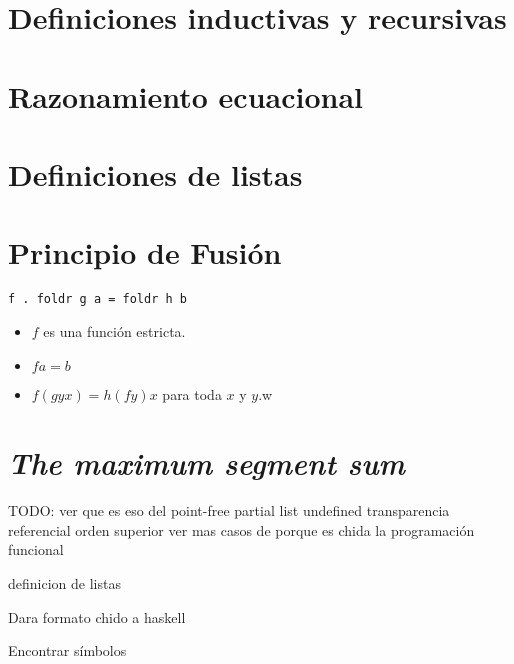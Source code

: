\section{Definiciones inductivas y recursivas}

\section{Razonamiento ecuacional}


\section{Definiciones de listas}

\section{Principio de Fusión}
\begin{verbatim}
f . foldr g a = foldr h b
\end{verbatim}

\begin{itemize}
    \item $f$ es una función estricta.
    \item $f a = b$
    \item $f(g y x) = h (f y) x$ para toda $x$ y $y$.w
\end{itemize}

\section{\textit{The maximum segment sum}}

TODO: ver que es eso del point-free
partial list
undefined
transparencia referencial
orden superior
ver mas casos de porque es chida la programación funcional


definicion de listas

Dara formato chido a haskell

Encontrar símbolos


